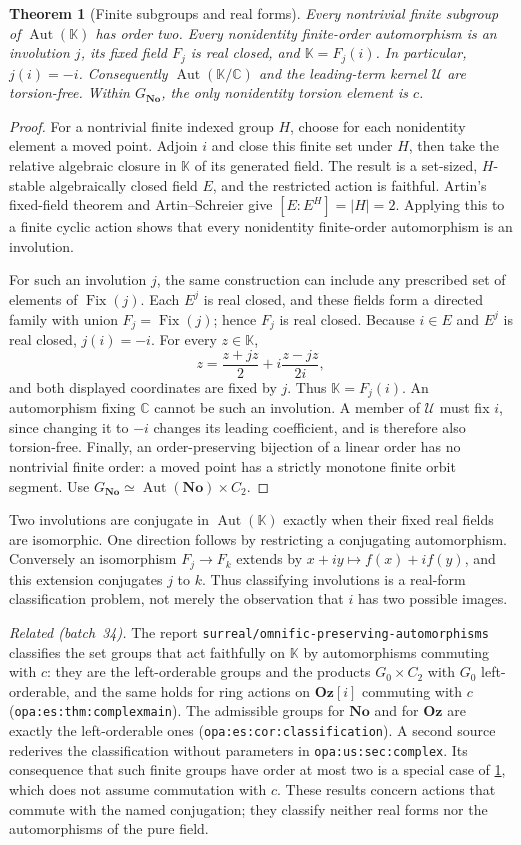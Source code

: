 \documentclass[11pt]{article}
\newtheorem{theorem}{Theorem}[section]
\theoremstyle{definition}
\theoremstyle{remark}
\newcommand{\No}{\mathbf{No}}
\newcommand{\C}{\mathbb C}
\newcommand{\K}{\mathbb K}
\newcommand{\U}{\mathcal U}
\newcommand{\Aut}{\operatorname{Aut}}
\newcommand{\Fix}{\operatorname{Fix}}
\newcommand{\repo}[1]{\nolinkurl{#1}}%
\newcommand{\lbl}[1]{\nolinkurl{#1}}%
\newcommand{\Oz}{\mathbf{Oz}}
\numberwithin{equation}{section}
\begin{document}
\begin{theorem}[Finite subgroups and real forms]\label{saut:thm:torsion}
Every nontrivial finite subgroup of $\Aut(\K)$ has order two.
Every nonidentity finite-order automorphism is an involution $j$, its fixed
field $F_j$ is real closed, and $\K=F_j(i)$. In particular, $j(i)=-i$.
Consequently $\Aut(\K/\C)$ and the leading-term kernel $\U$ are torsion-free.
Within $G_{\No}$, the only nonidentity torsion element is $c$.
\end{theorem}
\begin{proof}
For a nontrivial finite indexed group $H$, choose for each nonidentity
element a moved point. Adjoin $i$ and close this finite set under $H$,
then take the relative algebraic closure in $\K$ of its generated field.
The result is a set-sized, $H$-stable algebraically closed field $E$,
and the restricted action is faithful. Artin's fixed-field theorem and
Artin--Schreier give $[E:E^H]=|H|=2$. Applying this to a finite cyclic
action shows that every nonidentity finite-order automorphism is an
involution.

For such an involution $j$, the same construction can include any prescribed
set of elements of $\Fix(j)$. Each $E^j$ is real closed, and these fields
form a directed family with union $F_j=\Fix(j)$; hence $F_j$ is real closed.
Because $i\in E$ and $E^j$ is real closed, $j(i)=-i$. For every $z\in\K$,
\[
 z=\frac{z+jz}{2}+i\frac{z-jz}{2i},
\]
and both displayed coordinates are fixed by $j$. Thus $\K=F_j(i)$.
An automorphism fixing $\C$ cannot be such an involution.
A member of $\U$ must fix $i$, since changing it to $-i$ changes its leading
coefficient, and is therefore also torsion-free.
Finally, an order-preserving bijection of a linear order has no nontrivial
finite order: a moved point has a strictly monotone finite orbit segment.
Use $G_{\No}\simeq\Aut(\No)\times C_2$.
\end{proof}

Two involutions are conjugate in $\Aut(\K)$ exactly when their fixed real
fields are isomorphic. One direction follows by restricting a conjugating
automorphism. Conversely an isomorphism $F_j\to F_k$ extends by
$x+iy\mapsto f(x)+if(y)$, and this extension conjugates $j$ to $k$.
Thus classifying involutions is a real-form classification problem, not
merely the observation that $i$ has two possible images.

\emph{Related (batch~34).} The report
\repo{surreal/omnific-preserving-automorphisms} classifies the set groups
that act faithfully on $\K$ by automorphisms commuting with $c$: they are
the left-orderable groups and the products $G_0\times C_2$ with $G_0$
left-orderable, and the same holds for ring actions on $\Oz[i]$ commuting
with $c$ (\lbl{opa:es:thm:complexmain}). The admissible groups for $\No$ and
for $\Oz$ are exactly the left-orderable ones (\lbl{opa:es:cor:classification}).
A second source rederives the classification without parameters in
\lbl{opa:us:sec:complex}. Its consequence that such finite groups have order
at most two is a special case of \cref{saut:thm:torsion}, which does not
assume commutation with $c$. These results concern actions that commute
with the named conjugation; they classify neither real forms nor the
automorphisms of the pure field.
\end{document}
